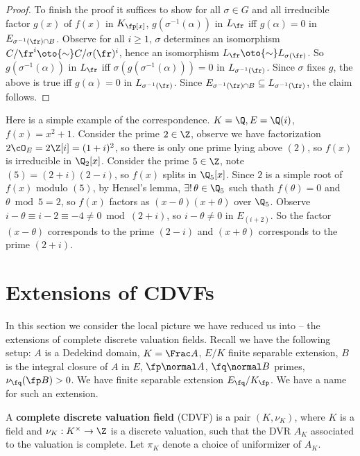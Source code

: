 \documentclass[11pt]{amsart}
\begin{document}
\begin{proof}
    To finish the proof it suffices to show for all $\sigma \in G$ and all
    irreducible factor $g(x)$ of $f(x)$ in $K_\fp[x]$, $g(\sigma^{-1}(\alpha))$
    in $L_\fr$ iff $g(\alpha) = 0$ in $E_{\sigma^{-1}(\fr) \cap B}$.  Observe
    for all $i \geq 1$, $\sigma$ determines an isomorphism $C/\fr^i \oto{\sim}
    C/\sigma(\fr)^i$, hence an isomorphism $L_\fr \oto{\sim} L_{\sigma(\fr)}$.
    So $g(\sigma^{-1}(\alpha))$ in $L_\fr$ iff $\sigma(g(\sigma^{-1}(\alpha))) =
    0$ in $L_{\sigma^{-1}(\fr)}$.  Since $\sigma$ fixes $g$, the above is true
    iff $g(\alpha) = 0$ in $L_{\sigma^{-1}(\fr)}$.  Since
    $E_{\sigma^{-1}(\fr) \cap B} \subseteq L_{\sigma^{-1}(\fr)}$, the claim
    follows.
\end{proof}

\medskip

Here is a simple example of the correspondence.  $K = \Q, E = \Q(i)$, $f(x) =
x^2 + 1$.  Consider the prime $2 \in \Z$, observe we have factorization $2 \cO_E =
2\Z[i] = (1 + i)^2$, so there is only one prime lying above $(2)$, so $f(x)$ is
irreducible in $\Q_{2}[x]$.  Consider the prime $5 \in \Z$, note $(5) = (2 +
i)(2 - i)$, so $f(x)$ splits in $\Q_{5}[x]$.  Since $2$ is a simple root of
$f(x)$ modulo $(5)$, by Hensel's lemma, $\exists!\, \theta \in \Q_{5}$ such
thath $f(\theta) = 0$ and $\theta \bmod{5} = 2$, so $f(x)$ factors as  $(x -
\theta) (x + \theta)$ over $\Q_{5}$.  Observe $i - \theta \equiv i - 2 \equiv
-4 \neq 0 \bmod{(2 + i)}$, so $i - \theta \neq 0$ in $E_{(i+2)}$.  So the factor
$(x - \theta)$ corresponds to the prime $(2 - i)$ and $(x + \theta)$ corresponds
to the prime $(2 + i)$.

\section{Extensions of CDVFs}

In this section we consider the local picture we have reduced us into -- the
extensions of complete discrete valuation fields.  Recall we have the following
setup: $A$ is a Dedekind domain, $K = \Frac A$, $E/K$ finite separable
extension, $B$ is the integral closure of $A$ in $E$, $\fp \normal A$, $\fq
\normal B$ primes, $\nu_{\fq}(\fp B) > 0$.  We have finite separable extension
$E_\fq / K_\fp$.  We have a name for such an extension.

\begin{defn}
    A {\bf complete discrete valuation field} (CDVF)  is a pair $(K,
    \nu_K)$, where $K$ is a field and $\nu_K : K^{\times} \to \Z$ is a discrete
    valuation, such that the DVR $A_K$ associated to the valuation is complete.
    Let $\pi_K$ denote a choice of uniformizer of $A_K$.
\end{defn}
\end{document}
